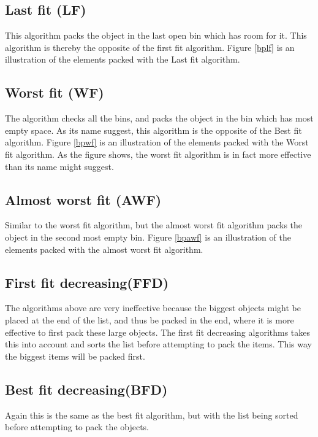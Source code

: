 \subsection{Last fit (LF)}
This algorithm packs the object in the last open bin which has room for it. This algorithm is thereby the opposite of the first fit algorithm. Figure \ref{bplf} is an illustration of the elements packed with the Last fit algorithm.


\subsection{Worst fit (WF)}
The algorithm checks all the bins, and packs the object in the bin which has most empty space. As its name suggest, this algorithm is the opposite of the Best fit algorithm. Figure \ref{bpwf} is an illustration of the elements packed with the Worst fit algorithm. As the figure shows, the worst fit algorithm is in fact more effective than its name might suggest. 

\subsection{Almost worst fit (AWF)}
Similar to the worst fit algorithm, but the almost worst fit algorithm packs the object in the second most empty bin.  Figure \ref{bpawf} is an illustration of the elements packed with the almost worst fit algorithm.

\subsection{First fit decreasing(FFD)}
The algorithms above are very ineffective because the biggest objects might be placed at the end of the list, and thus be packed in the end, where it is more effective to first pack these large objects.
The first fit decreasing algorithms takes this into account and sorts the list before attempting to pack the items. This way the biggest items will be packed first.

\subsection{Best fit decreasing(BFD)}
Again this is the same as the best fit algorithm, but with the list being sorted before attempting to pack the objects.

